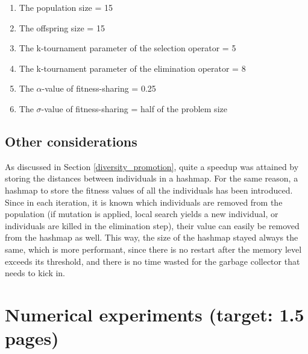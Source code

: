 \documentclass[a4paper,10pt]{article}
\newcommand{\ReplaceMe}[1]{{\color{blue}#1}}
\newcommand{\RemoveMe}[1]{{\color{purple}#1}}
\begin{document}
\begin{enumerate}
    \item The population size = 15
    \item The offspring size = 15
    \item The k-tournament parameter of the selection operator = 5 
    \item The k-tournament parameter of the elimination operator = 8
    \item The $\alpha$-value of fitness-sharing = 0.25
    \item The $\sigma$-value of fitness-sharing = half of the problem size
\end{enumerate}

\subsection{Other considerations}
As discussed in Section \ref{diversity_promotion}, quite a speedup was attained by storing the distances between individuals in a hashmap. For the same reason, a hashmap to store the fitness values of all the individuals has been introduced. Since in each iteration, it is known which individuals are removed from the population (if mutation is applied, local search yields a new individual, or individuals are killed in the elimination step), their value can easily be removed from the hashmap as well. This way, the size of the hashmap stayed always the same, which is more performant, since there is no restart after the memory level exceeds its threshold, and there is no time wasted for the garbage collector that needs to kick in.



\section{Numerical experiments (target: 1.5 pages)}

\end{document}
